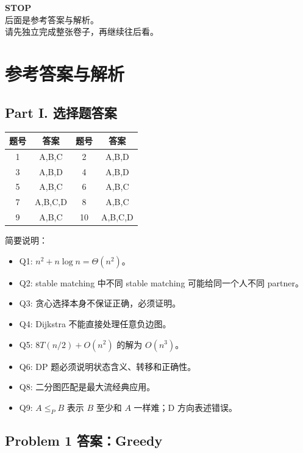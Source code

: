 \documentclass[UTF8,a4paper,11pt]{ctexart}
\begin{document}
\newpage
\thispagestyle{empty}
\begin{center}
{\Huge \textbf{STOP}}\\[2em]
{\Large 后面是参考答案与解析。}\\[1em]
{\Large 请先独立完成整张卷子，再继续往后看。}
\end{center}

\newpage
\section*{参考答案与解析}

\subsection*{Part I. 选择题答案}

\begin{center}
\begin{tabular}{c|c@{\qquad}c|c}
\toprule
题号 & 答案 & 题号 & 答案\\
\midrule
1 & A,B,C & 2 & A,B,D\\
3 & A,B,D & 4 & A,B,D\\
5 & A,B,C & 6 & A,B,C\\
7 & A,B,C,D & 8 & A,B,C\\
9 & A,B,C & 10 & A,B,C,D\\
\bottomrule
\end{tabular}
\end{center}

简要说明：
\begin{itemize}
  \item Q1: $n^2+n\log n=\Theta(n^2)$。
  \item Q2: stable matching 中不同 stable matching 可能给同一个人不同 partner。
  \item Q3: 贪心选择本身不保证正确，必须证明。
  \item Q4: Dijkstra 不能直接处理任意负边图。
  \item Q5: $8T(n/2)+O(n^2)$ 的解为 $O(n^3)$。
  \item Q6: DP 题必须说明状态含义、转移和正确性。
  \item Q8: 二分图匹配是最大流经典应用。
  \item Q9: $A\le_P B$ 表示 $B$ 至少和 $A$ 一样难；D 方向表述错误。
\end{itemize}

\subsection*{Problem 1 答案：Greedy}
\end{document}

